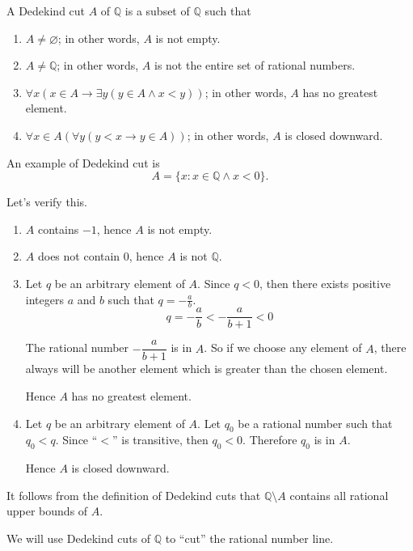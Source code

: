 \begin{definition}
    A Dedekind cut $A$ of $\mathbb{Q}$ is a subset of $\mathbb{Q}$ such that
    \begin{enumerate}[label = (DC\arabic*),itemindent=0.3cm]
        \item $A\ne\varnothing$; in other words, $A$ is not empty.
        \item $A\neq\mathbb{Q}$; in other words, $A$ is not the entire set of rational numbers.
        \item $\forall x\left(x\in A \rightarrow \exists y \left( y\in A \wedge x < y \right)\right)$; in other words, $A$ has no greatest element.
        \item $\forall x\in A\left(\forall y( y < x \rightarrow y\in A)\right)$; in other words, $A$ is closed downward.
    \end{enumerate}
\end{definition}

An example of Dedekind cut is
\[
    A = \{ x : x\in\mathbb{Q}\land x < 0 \}.
\]

Let's verify this.
\begin{enumerate}[label={(\roman*)}]
    \item $A$ contains $-1$, hence $A$ is not empty.
    \item $A$ does not contain $0$, hence $A$ is not $\mathbb{Q}$.
    \item Let $q$ be an arbitrary element of $A$. Since $q < 0$, then there exists positive integers $a$ and $b$ such that $q = -\frac{a}{b}$.
          \[
              q = -\frac{a}{b} < -\frac{a}{b + 1} < 0
          \]

          The rational number $-\dfrac{a}{b + 1}$ is in $A$. So if we choose any element of $A$, there always will be another element which is greater than the chosen element.

          Hence $A$ has no greatest element.
    \item Let $q$ be an arbitrary element of $A$. Let $q_{0}$ be a rational number such that $q_{0} < q$. Since ``$<$'' is transitive, then $q_{0} < 0$. Therefore $q_{0}$ is in $A$.

          Hence $A$ is closed downward.
\end{enumerate}

It follows from the definition of Dedekind cuts that $\mathbb{Q}\setminus A$ contains all rational upper bounds of $A$.

We will use Dedekind cuts of $\mathbb{Q}$ to ``cut'' the rational number line.

